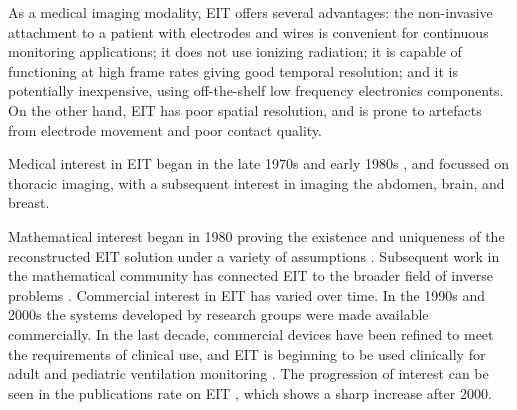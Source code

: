 \documentclass[12pt]{article} \usepackage[margin=3cm]{geometry} \usepackage[margin=20pt,font=small,labelfont=bf]{caption}\def\TBLWIDA{35mm}\def\TBLWIDB{95mm}
\begin{document}
As a medical imaging modality, EIT offers several advantages:
the non-invasive attachment to a patient with electrodes and wires
is convenient for continuous monitoring applications;
it does not use ionizing radiation;
it is capable of functioning at high frame rates giving
good temporal resolution; and
it is potentially inexpensive, using off-the-shelf low frequency electronics components. 
On the other hand, EIT has poor spatial resolution, and 
is prone to artefacts from electrode
movement and poor contact quality.



\begin{comment}
Medical applications of EIT have been a subject to active
research for nearly 40 years.
The last decade has seen a strong growth in 
clincal research and 
commercial interest, the availability of medically
certified devices, and early results from clinical use.

In the medical community, early work began in 
the late 1970s in USA \cite{Henderson78}, and
in the early 1980s in UK \cite{Barber1983}.
\end{comment}

Medical interest in EIT began in the late 1970s \cite{Henderson1978}
and early 1980s \cite{Barber1983}, and 
focussed on thoracic imaging,
with a subsequent interest in imaging the
abdomen, brain, and breast.
\begin{comment}
 From the late
1980s to the mid 1990s, much innovation in 
EIT was channelled through
a European Concerted Action on Impedance Tomography (CAIT),
as its associated European Community workshops on EIT.
After the end of the CAIT funding, the EIT technology community met through a
series of yearly International conferences on the biomedical applications of EIT.
\end{comment}
Mathematical interest began
in 1980 \cite{Calderon1980} proving
the existence and uniqueness of the reconstructed EIT solution 
under a variety of assumptions \cite{Sylvester1986Uniqueness}.
Subsequent work in the mathematical community has
connected EIT to the broader field
of inverse problems \cite{Uhlmann2009EIT}.
Commercial interest in EIT has varied over time. In the 1990s
and 2000s the systems developed by research groups were made
available commercially. In the last decade, 
commercial devices have been 
refined to meet the requirements of clinical use, and EIT
is beginning to be used clinically for adult and pediatric
ventilation monitoring \cite{Frerichs2017Chest}.
The progression of interest can be seen in 
the publications rate on EIT \cite{Adler2012Whither}, which
shows a sharp increase after 2000.
\end{document}
